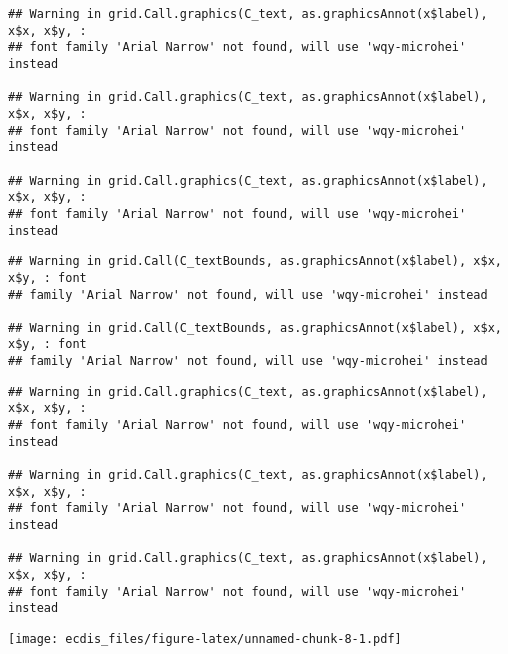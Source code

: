 \documentclass[
]{article}
\begin{document}
\begin{verbatim}
## Warning in grid.Call.graphics(C_text, as.graphicsAnnot(x$label), x$x, x$y, :
## font family 'Arial Narrow' not found, will use 'wqy-microhei' instead

## Warning in grid.Call.graphics(C_text, as.graphicsAnnot(x$label), x$x, x$y, :
## font family 'Arial Narrow' not found, will use 'wqy-microhei' instead

## Warning in grid.Call.graphics(C_text, as.graphicsAnnot(x$label), x$x, x$y, :
## font family 'Arial Narrow' not found, will use 'wqy-microhei' instead
\end{verbatim}

\begin{verbatim}
## Warning in grid.Call(C_textBounds, as.graphicsAnnot(x$label), x$x, x$y, : font
## family 'Arial Narrow' not found, will use 'wqy-microhei' instead

## Warning in grid.Call(C_textBounds, as.graphicsAnnot(x$label), x$x, x$y, : font
## family 'Arial Narrow' not found, will use 'wqy-microhei' instead
\end{verbatim}

\begin{verbatim}
## Warning in grid.Call.graphics(C_text, as.graphicsAnnot(x$label), x$x, x$y, :
## font family 'Arial Narrow' not found, will use 'wqy-microhei' instead

## Warning in grid.Call.graphics(C_text, as.graphicsAnnot(x$label), x$x, x$y, :
## font family 'Arial Narrow' not found, will use 'wqy-microhei' instead

## Warning in grid.Call.graphics(C_text, as.graphicsAnnot(x$label), x$x, x$y, :
## font family 'Arial Narrow' not found, will use 'wqy-microhei' instead
\end{verbatim}

\texttt{[image: ecdis\_files/figure-latex/unnamed-chunk-8-1.pdf]}
\end{document}
